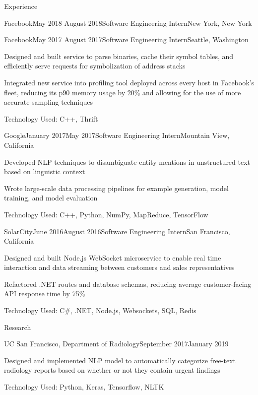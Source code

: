 \documentclass{resume} %
\begin{document}
\begin{rSection}{Experience}
\begin{rSubsection}{Facebook}{May 2018 \textminus August 2018}{Software Engineering Intern}{New York, New York}
\end{rSubsection}
\begin{rSubsection}{Facebook}{May 2017 \textminus August 2017}{Software Engineering Intern}{Seattle, Washington}
\item[] Designed and built service to parse binaries, cache their symbol tables, and efficiently serve requests for symbolization of address stacks
\item[] Integrated new service into profiling tool deployed across every host in Facebook's fleet, reducing its p90 memory usage by 20\% and allowing for the use of more accurate sampling techniques
\item[] Technology Used: C++, Thrift
\end{rSubsection}
\begin{rSubsection}{Google}{January 2017\textminus May 2017}{Software Engineering Intern}{Mountain View, California}
\item[] Developed NLP techniques to disambiguate entity mentions in unstructured text based on linguistic context
\item[] Wrote large-scale data processing pipelines for example generation, model training, and model evaluation
\item[] Technology Used: C++, Python, NumPy, MapReduce, TensorFlow
\end{rSubsection}
\begin{rSubsection}{SolarCity}{June 2016\textminus August 2016}{Software Engineering Intern}{San Francisco, California}
\item[] Designed and built Node.js WebSocket microservice to enable real time interaction and data streaming between customers and sales representatives
\item[] Refactored .NET routes and database schemas, reducing average customer-facing API response time by 75\%
\item[] Technology Used: C\#, .NET, Node.js, Websockets, SQL, Redis
\end{rSubsection}
\end{rSection}

\begin{rSection}{Research}
\begin{rSubsection}{UC San Francisco, Department of Radiology}{September 2017\textminus January 2019}{}{}
\item[] Designed and implemented NLP model to automatically categorize free-text radiology reports based on whether or not they contain urgent findings
\item[] Technology Used: Python, Keras, Tensorflow, NLTK
\end{rSubsection}
\end{rSection}
\end{document}
